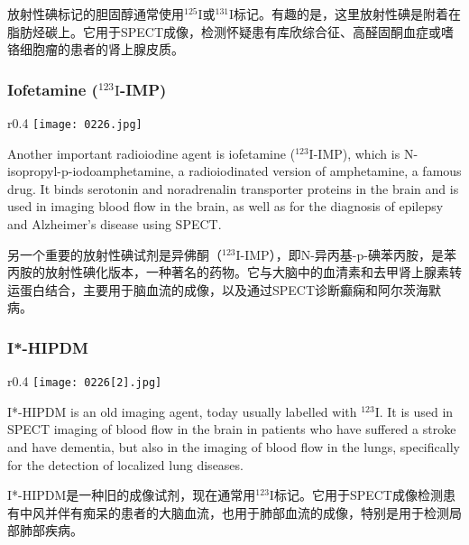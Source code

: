 \documentclass[dvipsnames, svgnames,a4paper,11pt]{article}
\begin{document}
放射性碘标记的胆固醇通常使用\(\mathrm{^{125}I}\)或\(\mathrm{^{131}I}\)标记。有趣的是，这里放射性碘是附着在脂肪烃碳上。它用于SPECT成像，检测怀疑患有库欣综合征、高醛固酮血症或嗜铬细胞瘤的患者的肾上腺皮质。

\subsubsection{Iofetamine (\(\mathrm{^{123}I}\)-IMP)}  

\begin{wrapfigure}{r}{0.4\textwidth}
    \centering
    \texttt{[image: 0226.jpg]}
     \label{fig297}
\end{wrapfigure}

Another important radioiodine agent is iofetamine (\(\mathrm{^{123}I}\)-IMP), which is N-isopropyl-p-iodoamphetamine, a radioiodinated version of amphetamine, a famous drug. It binds serotonin and noradrenalin transporter proteins in the brain and is used in imaging blood flow in the brain, as well as for the diagnosis of epilepsy and Alzheimer's disease using SPECT.

另一个重要的放射性碘试剂是异佛酮（\(\mathrm{^{123}I}\)-IMP），即N-异丙基-p-碘苯丙胺，是苯丙胺的放射性碘化版本，一种著名的药物。它与大脑中的血清素和去甲肾上腺素转运蛋白结合，主要用于脑血流的成像，以及通过SPECT诊断癫痫和阿尔茨海默病。

\subsubsection{I*-HIPDM}  
\begin{wrapfigure}{r}{0.4\textwidth}
    \centering
    \texttt{[image: 0226[2].jpg]}
     \label{fig298}
\end{wrapfigure}

I*-HIPDM is an old imaging agent, today usually labelled with \(\mathrm{^{123}I}\). It is used in SPECT imaging of blood flow in the brain in patients who have suffered a stroke and have dementia, but also in the imaging of blood flow in the lungs, specifically for the detection of localized lung diseases.

I*-HIPDM是一种旧的成像试剂，现在通常用\(\mathrm{^{123}I}\)标记。它用于SPECT成像检测患有中风并伴有痴呆的患者的大脑血流，也用于肺部血流的成像，特别是用于检测局部肺部疾病。
\end{document}
